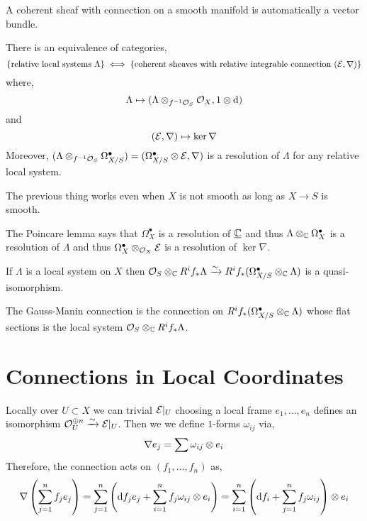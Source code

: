 \documentclass[12pt]{article}
\begin{document}
\begin{prop}
A coherent sheaf with connection on a smooth manifold is automatically a vector bundle. 
\end{prop}

\begin{thm}
There is an equivalence of categories,
\[ \{ \text{relative local systems } \Lambda \} \iff \{ \text{coherent sheaves with relative integrable connection } (\mathcal{E}, \nabla) \} \]
where,
\[ \Lambda \mapsto (\Lambda \otimes_{f^{-1} \mathcal{O}_{S}} \mathcal{O}_{X}, 1 \otimes \mathrm{d}) \]
and
\[ (\mathcal{E}, \nabla) \mapsto \ker{\nabla} \]
Moreover, $(\Lambda \otimes_{f^{-1} \mathcal{O}_{S}} \Omega_{X/S}^\bullet) = (\Omega^\bullet_{X/S} \otimes \mathcal{E}, \nabla)$ is a resolution of $\Lambda$ for any relative local system. 
\end{thm}

\begin{rmk}
The previous thing works even when $X$ is not smooth as long as $X \to S$ is smooth.
\end{rmk}

\begin{rmk}
The Poincare lemma says that $\Omega^\bullet_X$ is a resolution of $\underline{\mathbb{C}}$ and thus $\Lambda \otimes_{\mathbb{C}} \Omega^\bullet_X$ is a resolution of $\Lambda$ and thus $\Omega_X^\bullet \otimes_{\mathcal{O}_{X}} \mathcal{E}$ is a resolution of $\ker{\nabla}$. 
\end{rmk}

\begin{cor}
If $\Lambda$ is a local system on $X$ then $\mathcal{O}_{S} \otimes_{\mathbb{C}} R^i f_* \Lambda \xrightarrow{\sim} R^i f_* (\Omega^\bullet_{X/S} \otimes_{\mathbb{C}} \Lambda)$ is a quasi-isomorphism. 
\end{cor}

\begin{defn}
The Gauss-Manin connection is the connection on $R^i f_* (\Omega^\bullet_{X/S} \otimes_{\mathbb{C}} \Lambda)$ whose flat sections is the local system $\mathcal{O}_{S} \otimes_{\mathbb{C}} R^i f_* \Lambda$. 
\end{defn}

\section{Connections in Local Coordinates}

Locally over $U \subset X$ we can trivial $\mathcal{E}|_U$ choosing a local frame $e_1, \dots, e_n$ defines an isomorphism $\mathcal{O}_{U}^{\oplus n} \xrightarrow{\sim} \mathcal{E}|_U$. Then we we define $1$-forms $\omega_{ij}$ via,
\[ \nabla e_j = \sum \omega_{ij} \otimes e_i \]
Therefore, the connection acts on $(f_1, \dots, f_n)$ as,
\[ \nabla \left( \sum_{j = 1}^n f_j e_j \right) = \sum_{j = 1}^n \left( \mathrm{d}{f_j} e_j + \sum_{i = 1}^n f_j \omega_{ij} \otimes e_i \right) = \sum_{i = 1}^n \left( \mathrm{d}{f_i} + \sum_{j = 1}^n f_j \omega_{ij} \right) \otimes e_i \]
\end{document}
